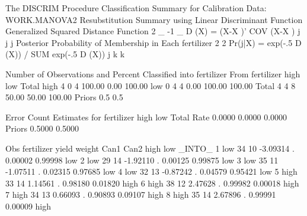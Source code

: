 \documentclass{article}
\begin{document}
\begin{Woutput}
The DISCRIM Procedure
Classification Summary for Calibration Data: WORK.MANOVA2
Resubstitution Summary using Linear Discriminant Function
Generalized Squared Distance Function
 2         _       -1   _
D (X) = (X-X )' COV  (X-X )
 j          j            j
Posterior Probability of Membership in Each fertilizer
                   2                    2
Pr(j|X) = exp(-.5 D (X)) / SUM exp(-.5 D (X))
                   j        k           k

Number of Observations and Percent Classified into fertilizer
From
fertilizer         high          low        Total
high                  4            0            4
                 100.00         0.00       100.00
low                   0            4            4
                   0.00       100.00       100.00
Total                 4            4            8
                  50.00        50.00       100.00
Priors              0.5          0.5

      Error Count Estimates for fertilizer
                    high         low       Total
Rate              0.0000      0.0000      0.0000
Priors            0.5000      0.5000

Obs    fertilizer    yield    weight      Can1      Can2      high       low      _INTO_
 1        low          34       10      -3.09314      .     0.00002    0.99998     low
 2        low          29       14      -1.92110      .     0.00125    0.99875     low
 3        low          35       11      -1.07511      .     0.02315    0.97685     low
 4        low          32       13      -0.87242      .     0.04579    0.95421     low
 5        high         33       14       1.14561      .     0.98180    0.01820     high
 6        high         38       12       2.47628      .     0.99982    0.00018     high
 7        high         34       13       0.66093      .     0.90893    0.09107     high
 8        high         35       14       2.67896      .     0.99991    0.00009     high
\end{Woutput}
\end{document}
